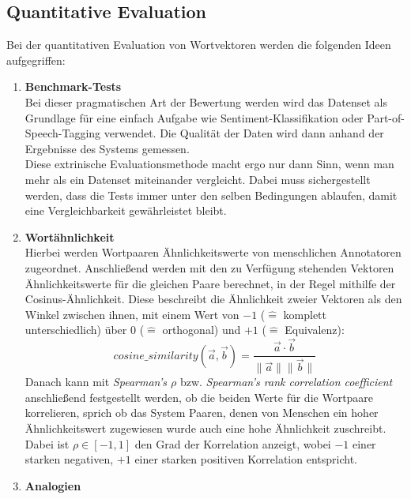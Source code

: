   \subsection{Quantitative Evaluation}

  Bei der quantitativen Evaluation von Wortvektoren werden die folgenden Ideen aufgegriffen:\\
  \begin{enumerate}
    \item \textbf{Benchmark-Tests}\\
      Bei dieser pragmatischen Art der Bewertung werden wird das Datenset als Grundlage für
      eine einfach Aufgabe wie Sentiment-Klassifikation oder Part-of-Speech-Tagging verwendet.
      Die Qualität der Daten wird dann anhand der Ergebnisse des Systems gemessen.\\
      Diese extrinische Evaluationsmethode macht ergo nur dann Sinn, wenn man mehr als ein Datenset
      miteinander vergleicht. Dabei muss sichergestellt werden, dass die Tests immer unter den
      selben Bedingungen ablaufen, damit eine Vergleichbarkeit gewährleistet bleibt.\\
    \item \textbf{Wortähnlichkeit}\\
      Hierbei werden Wortpaaren Ähnlichkeitswerte von menschlichen Annotatoren zugeordnet. Anschließend
      werden mit den zu Verfügung stehenden Vektoren Ähnlichkeitswerte für die gleichen Paare berechnet,
      in der Regel mithilfe der Cosinus-Ähnlichkeit. Diese beschreibt die Ähnlichkeit zweier Vektoren
      als den Winkel zwischen ihnen, mit einem Wert von $-1$ ($\hat{=}$ komplett unterschiedlich) über 0
      ($\hat{=}$ orthogonal) und $+1$ ($\hat{=}$ Equivalenz):
      \begin{equation}
        cosine\_similarity(\vec{a}, \vec{b}) = \frac{\vec{a} \cdot \vec{b}}{\|\vec{a}\| \|\vec{b}\|}
      \end{equation}
      Danach kann mit \emph{Spearman's $\rho$} bzw. \emph{Spearman's rank correlation coefficient}
      anschließend festgestellt werden, ob die beiden Werte für die Wortpaare korrelieren, sprich ob
      das System Paaren, denen von Menschen ein hoher Ähnlichkeitswert zugewiesen wurde auch eine hohe
      Ähnlichkeit zuschreibt. Dabei ist $\rho \in [-1, 1]$ den Grad der Korrelation anzeigt, wobei
      $-1$ einer starken negativen, $+1$ einer starken positiven Korrelation entspricht.
    \item \textbf{Analogien}\\

\end{enumerate}
